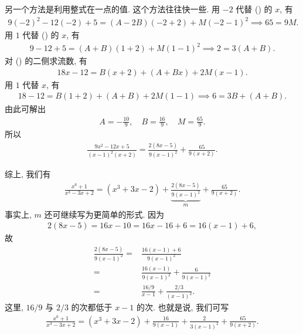 \begin{example}
    另一个方法是利用整式在一点的值. 这个方法往往快一些. 用 $-2$ 代替 () 的 $x$, 有
    \begin{align*}
        9(-2)^2 - 12(-2) + 5 = (A - 2B) (-2 + 2) + M (-2-1)^2 \implies 65 = 9M.
    \end{align*}
    用 $1$ 代替 () 的 $x$, 有
    \begin{align*}
        9 - 12 + 5 = (A + B) (1 + 2) + M (1 - 1)^2 \implies 2 = 3 (A + B).
    \end{align*}
    对 () 的二侧求流数, 有
    \begin{align*}
        18x - 12 = B (x + 2) + (A + Bx) + 2M (x - 1).
    \end{align*}
    用 $1$ 代替 $x$, 有
    \begin{align*}
        18 - 12 = B (1 + 2) + (A + B) + 2M (1 - 1) \implies 6 = 3B + (A + B).
    \end{align*}
    由此可解出
    \begin{align*}
        A = -\frac{10}{9}, \quad B = \frac{16}{9}, \quad M = \frac{65}{9}.
    \end{align*}
    所以
    \begin{align*}
        \frac{9x^2 - 12x + 5}{(x - 1)^2 (x + 2)} = \frac{2(8x - 5)}{9(x - 1)^2} + \frac{65}{9(x + 2)}.
    \end{align*}

    综上, 我们有
    \begin{align*}
        \frac{x^6 + 1}{x^3 - 3x + 2} = (x^3 + 3x - 2) + {\underbrace{\frac{2(8x - 5)}{9(x - 1)^2}}_{m}} + \frac{65}{9(x + 2)}.
    \end{align*}
    事实上, $m$ 还可继续写为更简单的形式. 因为
    \begin{align*}
        2(8x - 5) = 16x - 10 = 16x - 16 + 6 = 16(x - 1) + 6,
    \end{align*}
    故
    \begin{align*}
        \frac{2(8x - 5)}{9(x - 1)^2}
        = {} & \frac{16(x - 1) + 6}{9(x - 1)^2}                    \\
        = {} & \frac{16(x - 1)}{9(x - 1)^2} + \frac{6}{9(x - 1)^2} \\
        = {} & \frac{16/9}{x - 1} + \frac{2/3}{(x - 1)^2}.
    \end{align*}
    这里, $16/9$ 与 $2/3$ 的次都低于 $x-1$ 的次. 也就是说, 我们可写
    \begin{align*}
        \frac{x^6 + 1}{x^3 - 3x + 2} = (x^3 + 3x - 2) + \frac{16}{9(x - 1)} + \frac{2}{3(x - 1)^2} + \frac{65}{9(x + 2)}.
    \end{align*}
\end{example}

